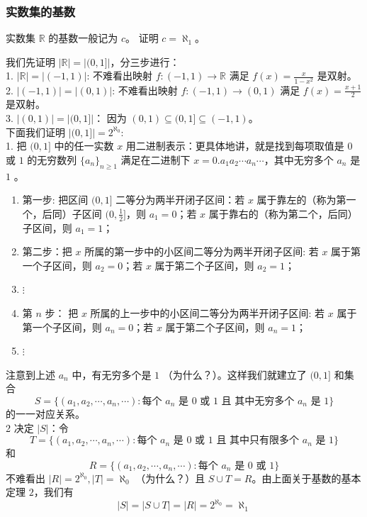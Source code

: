 \documentclass{ctexbook}
\newcommand{\no}{\noindent}
\newcommand{\pro}{\no{\bf 证明：}}
\newcommand{\R}{\mathbb{R}}
\newcommand{\ITEMS}{\begin{enumerate}[leftmargin=4em]}
\newcommand{\ITEME}{\end{enumerate}}
\begin{document}
\subsubsection{实数集的基数}
实数集 $\R$ 的基数一般记为 $c$。 证明 $c=\aleph_1$。\\
\pro

我们先证明 $\lvert \R \rvert=\lvert (0,1]\rvert $，分三步进行：\\

1. $\lvert \R\rvert =\lvert (-1,1)\rvert $: 不难看出映射  $f:(-1,1)\rightarrow \R$ 满足 $f(x)=\frac {x}{1-x^2}$ 是双射。\\

2. $\lvert (-1,1)\rvert=\lvert (0,1)\rvert $: 不难看出映射  $f:(-1,1)\rightarrow (0,1) $ 满足 $f(x)=\frac {x+1}{2}$ 是双射。\\

3. $\lvert (0,1)\rvert=\lvert (0,1]\rvert $： 因为 $(0,1)\subseteq (0,1]\subseteq (-1,1)$。\\

下面我们证明 $\lvert (0,1]\rvert=2^{\aleph_0}$: \\
1. 把 $(0,1]$ 中的任一实数 $x$ 用二进制表示：更具体地讲，就是找到每项取值是 $0$ 或 $1$ 的无穷数列 $\{a_n\}_{n \ge 1}$ 满足在二进制下 $x=0.a_1 a_2\cdots a_n \cdots$，其中无穷多个 $a_n$ 是 $1$ 。\\
\ITEMS 
	\item 第一步: 把区间 $(0,1]$ 二等分为两半开闭子区间：若 $x$ 属于靠左的（称为第一个，后同）子区间 $(0,\frac{1}{2}]$，则 $a_1=0$；若 $x$ 属于靠右的（称为第二个，后同）子区间，则 $a_1=1$；
	
	\item 第二步：把 $x$ 所属的第一步中的小区间二等分为两半开闭子区间:  若 $x$ 属于第一个子区间，则 $a_2=0$；若 $x$ 属于第二个子区间，则 $a_2=1$；
	\item $\vdots$ 
	\item 第 $n$ 步： 把 $x$ 所属的上一步中的小区间二等分为两半开闭子区间:  若 $x$ 属于第一个子区间，则 $a_n=0$；若 $x$ 属于第二个子区间，则 $a_n=1$；
	\item $\vdots$
\ITEME
    注意到上述 $a_n$ 中，有无穷多个是 $1$ （为什么？）。这样我们就建立了 $(0,1]$ 和集合 $$S=\{(a_1, a_2,\cdots, a_n, \cdots): \mbox{每个 $a_n$ 是 $0$ 或 $1$ 且 其中无穷多个 $a_n$ 是 $1$} \}$$ 的一一对应关系。\\
2 决定 $\lvert S\rvert$：令 $$T=\{(a_1, a_2,\cdots, a_n, \cdots): \mbox{每个 $a_n$ 是 $0$ 或 $1$ 且 其中只有限多个 $a_n$ 是 $1$} \}$$ 和 $$ R=\{(a_1, a_2,\cdots, a_n, \cdots): \mbox{每个 $a_n$ 是 $0$ 或 $1$}\}$$ 
不难看出 $\lvert R\rvert=2^{\aleph_0}, \lvert T\rvert=\aleph_0$ （为什么？）且 $S\cup T= R$。由上面关于基数的基本定理 $2$，我们有 $$\lvert S\rvert=\lvert S\cup T\rvert =\lvert R\rvert=2^{\aleph_0}=\aleph_1$$
\end{document}
